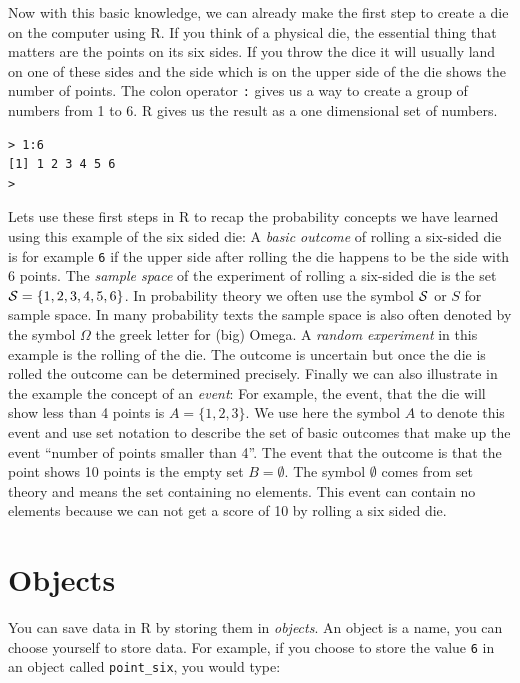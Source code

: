\documentclass[
]{book}
\begin{document}
Now with this basic knowledge, we can already make the first step to create a
die on the computer
using R. If you think of a physical die, the essential thing that matters are
the points on its
six sides. If you throw the dice it will usually land on one of these sides
and the side which is
on the upper side of the die shows the number of points.
The colon operator \texttt{:} gives us a way to
create a group of numbers from 1 to 6. R gives us the result as a
one dimensional set of numbers.

\begin{verbatim}
> 1:6
[1] 1 2 3 4 5 6
> 
\end{verbatim}

Lets use these first steps in R to recap the probability concepts we have learned using this
example of the six sided die:
A \emph{basic outcome} of rolling a six-sided die is for example \texttt{6} if the upper side after
rolling the die happens
to be the side with 6 points. The \emph{sample space} of the experiment of rolling a six-sided die is
the set \({\cal S} = \{1,2,3,4,5,6\}\). In probability theory we often use the symbol \({\cal S}\) or
\(S\) for sample space. In many probability texts the sample space is also often denoted by
the symbol \(\Omega\) the greek letter for (big) Omega. A \emph{random experiment} in this example is
the rolling of the die. The outcome is uncertain but once the die is rolled the outcome
can be determined precisely. Finally we can also illustrate in the example the concept of an
\emph{event}: For example, the event, that the die will show less than 4 points is \(A = \{1,2,3\}\). We use here
the symbol \(A\) to denote this event and use set notation to describe the set of basic outcomes that
make up the event ``number of points smaller than 4''. The event that the outcome is that the point
shows 10 points is the empty set \(B = \emptyset\). The symbol \(\emptyset\) comes from set theory and
means the set containing no elements. This event can contain no elements because we can not get
a score of 10 by rolling a six sided die.

\hypertarget{objects}{%
\section{Objects}\label{objects}}

You can save data in R by storing them in \emph{objects}. An object is a name, you can choose yourself to
store data. For example, if you choose to store the value \texttt{6} in an object called \texttt{point\_six},
you would type:
\end{document}
